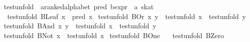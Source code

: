 \begin{isabellebody}
{\isafoldproof}%
%
\isadelimproof
\isanewline
%
\endisadelimproof
\isanewline
{}\isamarkupfalse%
\ test{}unfold\ {}{}\ {}{}a{}{}ranked{}alphabet\ pred\ bexpr\ {}\ {}a\ skat{}\ \isanewline
\ \ {}test{}unfold\ {}BLeaf\ x{}\ {}\ pred\ x{}\isanewline
{}\ {}test{}unfold\ {}BOr\ x\ y{}\ {}\ test{}unfold\ x\ {}\ test{}unfold\ y{}\isanewline
{}\ {}test{}unfold\ {}BAnd\ x\ y{}\ {}\ test{}unfold\ x\ {}\ test{}unfold\ y{}\isanewline
{}\ {}test{}unfold\ {}BNot\ x{}\ {}\ {}{}test{}unfold\ x{}{}\isanewline
{}\ {}test{}unfold\ BOne\ {}\ {}{}\isanewline
{}\ {}test{}unfold\ BZero\ {}\ {}{}\isanewline

\end{isabellebody}
